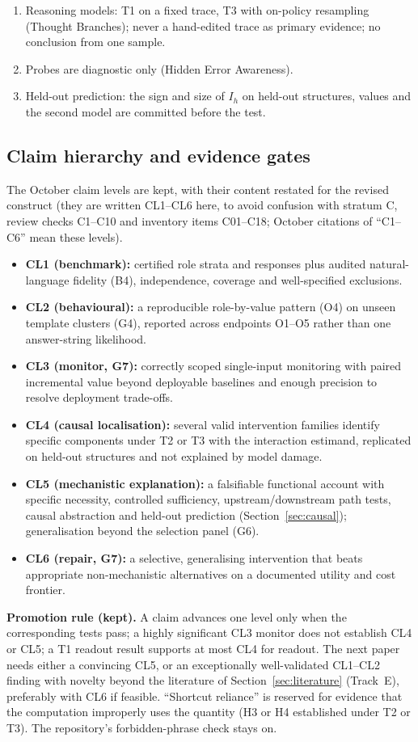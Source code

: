 \documentclass[10pt,a4paper]{article}
\begin{document}
\begin{enumerate}
\item Reasoning models: T1 on a fixed trace, T3 with on-policy resampling (Thought Branches); never a hand-edited trace as primary evidence; no conclusion from one sample.
\item Probes are diagnostic only (Hidden Error Awareness).
\item Held-out prediction: the sign and size of $I_h$ on held-out structures, values and the second model are committed before the test.
\end{enumerate}

\subsection{Claim hierarchy and evidence gates}
\label{sec:claims}

The October claim levels are kept, with their content restated for the revised construct (they are written
CL1--CL6 here, to avoid confusion with stratum C, review checks C1--C10 and inventory items C01--C18; October
citations of ``C1--C6'' mean these levels).
\begin{itemize}
\item \textbf{CL1 (benchmark):} certified role strata and responses plus audited natural-language fidelity
(B4), independence, coverage and well-specified exclusions.
\item \textbf{CL2 (behavioural):} a reproducible role-by-value pattern (O4) on unseen template clusters (G4),
reported across endpoints O1--O5 rather than one answer-string likelihood.
\item \textbf{CL3 (monitor, G7):} correctly scoped single-input monitoring with paired incremental value beyond
deployable baselines and enough precision to resolve deployment trade-offs.
\item \textbf{CL4 (causal localisation):} several valid intervention families identify specific components under
T2 or T3 with the interaction estimand, replicated on held-out structures and not explained by model damage.
\item \textbf{CL5 (mechanistic explanation):} a falsifiable functional account with specific necessity,
controlled sufficiency, upstream/downstream path tests, causal abstraction and held-out prediction
(Section~\ref{sec:causal}); generalisation beyond the selection panel (G6).
\item \textbf{CL6 (repair, G7):} a selective, generalising intervention that beats appropriate non-mechanistic
alternatives on a documented utility and cost frontier.
\end{itemize}
\textbf{Promotion rule (kept).} A claim advances one level only when the corresponding tests pass; a highly
significant CL3 monitor does not establish CL4 or CL5; a T1 readout result supports at most CL4 for readout. The next
paper needs either a convincing CL5, or an exceptionally well-validated CL1--CL2 finding with novelty beyond the
literature of Section~\ref{sec:literature} (Track~E), preferably with CL6 if feasible. ``Shortcut reliance'' is
reserved for evidence that the computation improperly uses the quantity (H3 or H4 established under T2 or T3). The
repository's forbidden-phrase check stays on.
\end{document}
